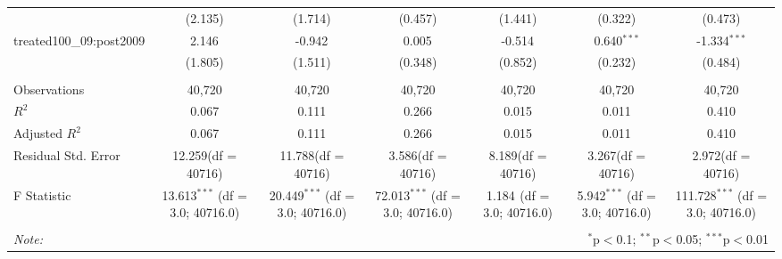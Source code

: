 \documentclass[12pt]{article}
\begin{document}
\begin{table}[!htbp]
\begin{tabular}{@{\extracolsep{5pt}}lcccccc}
  & (2.135) & (1.714) & (0.457) & (1.441) & (0.322) & (0.473) \\
 treated100_09:post2009 & 2.146$^{}$ & -0.942$^{}$ & 0.005$^{}$ & -0.514$^{}$ & 0.640$^{***}$ & -1.334$^{***}$ \\
  & (1.805) & (1.511) & (0.348) & (0.852) & (0.232) & (0.484) \\
\hline \\[-1.8ex]
 Observations & 40,720 & 40,720 & 40,720 & 40,720 & 40,720 & 40,720 \\
 $R^2$ & 0.067 & 0.111 & 0.266 & 0.015 & 0.011 & 0.410 \\
 Adjusted $R^2$ & 0.067 & 0.111 & 0.266 & 0.015 & 0.011 & 0.410 \\
 Residual Std. Error & 12.259(df = 40716) & 11.788(df = 40716) & 3.586(df = 40716) & 8.189(df = 40716) & 3.267(df = 40716) & 2.972(df = 40716)  \\
 F Statistic & 13.613$^{***}$ (df = 3.0; 40716.0) & 20.449$^{***}$ (df = 3.0; 40716.0) & 72.013$^{***}$ (df = 3.0; 40716.0) & 1.184$^{}$ (df = 3.0; 40716.0) & 5.942$^{***}$ (df = 3.0; 40716.0) & 111.728$^{***}$ (df = 3.0; 40716.0) \\
\hline
\hline \\[-1.8ex]
\textit{Note:} & \multicolumn{6}{r}{$^{*}$p$<$0.1; $^{**}$p$<$0.05; $^{***}$p$<$0.01} \\
\end{tabular}
\end{table}
\end{document}
